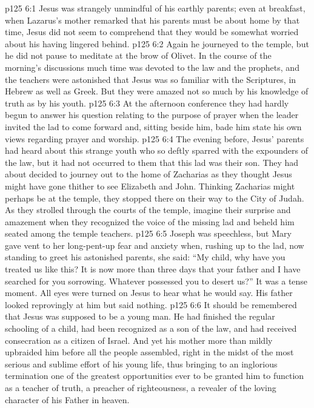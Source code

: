 \vs p125 6:1 Jesus was strangely unmindful of his earthly parents; even at breakfast, when Lazarus’s mother remarked that his parents must be about home by that time, Jesus did not seem to comprehend that they would be somewhat worried about his having lingered behind.
\vs p125 6:2 Again he journeyed to the temple, but he did not pause to meditate at the brow of Olivet. In the course of the morning’s discussions much time was devoted to the law and the prophets, and the teachers were astonished that Jesus was so familiar with the Scriptures, in Hebrew as well as Greek. But they were amazed not so much by his knowledge of truth as by his youth.
\vs p125 6:3 At the afternoon conference they had hardly begun to answer his question relating to the purpose of prayer when the leader invited the lad to come forward and, sitting beside him, bade him state his own views regarding prayer and worship.
\vs p125 6:4 \pc The evening before, Jesus’ parents had heard about this strange youth who so deftly sparred with the expounders of the law, but it had not occurred to them that this lad was their son. They had about decided to journey out to the home of Zacharias as they thought Jesus might have gone thither to see Elizabeth and John. Thinking Zacharias might perhaps be at the temple, they stopped there on their way to the City of Judah. As they strolled through the courts of the temple, imagine their surprise and amazement when they recognized the voice of the missing lad and beheld him seated among the temple teachers.
\vs p125 6:5 Joseph was speechless, but Mary gave vent to her long\hyp{}pent\hyp{}up fear and anxiety when, rushing up to the lad, now standing to greet his astonished parents, she said: “My child, why have you treated us like this? It is now more than three days that your father and I have searched for you sorrowing. Whatever possessed you to desert us?” It was a tense moment. All eyes were turned on Jesus to hear what he would say. His father looked reprovingly at him but said nothing.
\vs p125 6:6 \pc It should be remembered that Jesus was supposed to be a young man. He had finished the regular schooling of a child, had been recognized as a son of the law, and had received consecration as a citizen of Israel. And yet his mother more than mildly upbraided him before all the people assembled, right in the midst of the most serious and sublime effort of his young life, thus bringing to an inglorious termination one of the greatest opportunities ever to be granted him to function as a teacher of truth, a preacher of righteousness, a revealer of the loving character of his Father in heaven.
